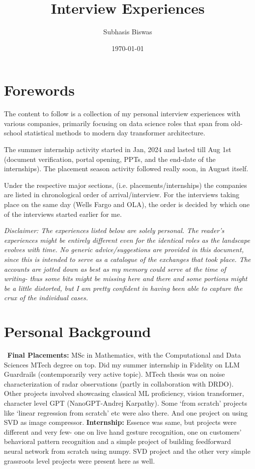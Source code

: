 \documentclass[12pt]{article}
\title{Interview Experiences}
\author{Subhasis Biswas}
\date{\today} %
\begin{document}
\maketitle
\tableofcontents

\section*{Forewords}

The content to follow is a collection of my personal interview experiences with various companies, primarily focusing on data science roles that span from old-school statistical methods to modern day transformer architecture.

The summer internship activity started in Jan, 2024 and lasted till Aug 1st (document verification, portal opening, PPTs, and the end-date of the internships). The placement season activity followed really soon, in August itself.

Under the respective major sections, (i.e. placements/internships) the companies are listed in chronological order of arrival/interview. For the interviews taking place on the same day (Wells Fargo and OLA), the order is decided by which one of the interviews started earlier for me. 

\textit{Disclaimer: The experiences listed below are solely personal. The reader's experiences might be entirely different even for the identical roles as the landscape evolves with time. No generic advice/suggestions are provided in this document, since this is intended to serve as a catalogue of the exchanges that took place. The accounts are jotted down as best as my memory could serve at the time of writing- thus some bits might be missing here and there and some portions might be a little distorted, but I am pretty confident in having been able to capture the crux of the individual cases.}

\section{Personal Background}
\
\textbf{Final Placements: }MSc in Mathematics, with the Computational and Data Sciences MTech degree on top. 
Did my summer internship in Fidelity on LLM Guardrails (contemporarily very active topic). 
MTech thesis was on noise characterization of radar observations (partly in collaboration with DRDO).
Other projects involved showcasing classical ML proficiency, vision transformer, character level GPT (NanoGPT-Andrej Karpathy). Some `from scratch' projects like `linear regression from scratch' etc were also there. And one project on using SVD as image compressor.
\newline
\newline
\textbf{Internship:} Essence was same, but projects were different and very few- one on live hand gesture recognition, one on customers' behavioral pattern recognition and a simple project of building feedforward neural network from scratch using numpy. SVD project and the other very simple grassroots level projects were present here as well.
\end{document}
